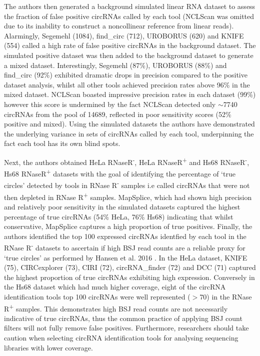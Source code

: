 \documentclass[pdflatex,sn-mathphys-num]{sn-jnl}
\begin{document}
The authors then generated a background simulated linear RNA dataset to assess the fraction of false positive circRNAs called by each tool (NCLScan was omitted due to its inability to construct a noncollinear reference from linear reads). Alarmingly, Segemehl (1084), find\_circ (712), UROBORUS (620) and KNIFE (554) called a high rate of false positive circRNAs in the background dataset. The simulated positive dataset was then added to the background dataset to generate a mixed dataset. Interestingly, Segemehl (87\%), UROBORUS (88\%) and find\_circ (92\%) exhibited dramatic drops in precision compared to the positive dataset analysis, whilst all other tools achieved precision rates above 96\% in the mixed dataset. NCLScan boasted impressive precision rates in each dataset (99\%) however this score is undermined by the fact NCLScan detected only $\sim$7740 circRNAs from the pool of 14689, reflected in poor sensitivity scores (52\% positive and mixed). Using the simulated datasets the authors have demonstrated the underlying variance in sets of circRNAs called by each tool, underpinning the fact each tool has its own blind spots. \par

Next, the authors obtained HeLa RNaseR\textsuperscript{-}, HeLa RNaseR\textsuperscript{+} and Hs68 RNaseR\textsuperscript{-}, Hs68 RNaseR\textsuperscript{+} datasets with the goal of identifying the percentage of `true circles' detected by tools in RNase R\textsuperscript{-} samples i.e called circRNAs that were not then depleted in RNase R\textsuperscript{+} samples. MapSplice, which had shown high precision and relatively poor sensitivity in the simulated datasets captured the highest percentage of true circRNAs (54\% HeLa, 76\% Hs68) indicating that whilst conservative, MapSplice captures a high proportion of true positives. Finally, the authors identified the top 100 expressed circRNAs identfied by each tool in the RNase R\textsuperscript{-} datasets to ascertain if high BSJ read counts are a reliable proxy for `true circles' as performed by Hansen et al. 2016 \cite{Hansen2016Apr}. In the HeLa dataset, KNIFE (75), CIRCexplorer (73), CIRI (72), circRNA\_finder (72) and DCC (71) captured the highest proportion of true circRNAs exhibiting high expression. Conversely in the Hs68 dataset which had much higher coverage, eight of the circRNA identification tools top 100 circRNAs were well represented ($>$70) in the RNase R\textsuperscript{+} samples. This demonstrates high BSJ read counts are not necessarily indicative of true circRNAs, thus the common practice of applying BSJ count filters will not fully remove false positives. Furthermore, researchers should take caution when selecting circRNA identification tools for analysing sequencing libraries with lower coverage. \par
\end{document}
